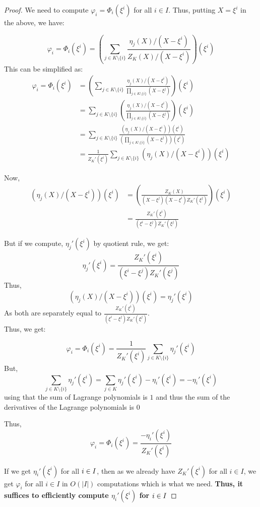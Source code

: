 \begin{proof}
    We need to compute $\varphi_i=\Phi_i(\xi^i)$ for all $i \in I$. Thus, putting $X=\xi^i$ in the above, we have:

    $$\varphi_i = \Phi_i(\xi^i) = \left(\sum_{j\in K\setminus \{i\}}\frac{\eta_j(X)/(X-\xi^i)}{Z_K(X)/(X-\xi^i)}\right)(\xi^i)$$
    This can be simplified as:
    \begin{align*}\varphi_i = \Phi_i(\xi^i) &= \left(\sum_{j\in K\setminus \{i\}}\frac{\eta_j(X)/(X-\xi^i)}{\prod_{j \in K \setminus \{i\}}(X-\xi^j)}\right)(\xi^i)\\
    &= \sum_{j\in K\setminus \{i\}}\left(\frac{\eta_j(X)/(X-\xi^i)}{\prod_{j \in K \setminus \{i\}}(X-\xi^j)}\right)(\xi^i)\\
    &= \sum_{j\in K\setminus \{i\}}\frac{\left(\eta_j(X)/(X-\xi^i)\right)(\xi^i)}{\left(\prod_{j \in K \setminus \{i\}}(X-\xi^j)\right)(\xi^i)}\\
    &= \frac{1}{Z_K'(\xi^i)}\sum_{j\in K\setminus \{i\}}\left(\eta_j(X)/(X-\xi^i)\right)(\xi^i)
    \end{align*}

    Now, \begin{align*}
             \left(\eta_j(X)/(X-\xi^i)\right)(\xi^i)&=\left(\frac{Z_K(X)}{(X-\xi^j)(X-\xi^i)Z_K'(\xi^j)}\right)(\xi^i)\\
             &= \frac{Z_K'(\xi^i)}{(\xi^i-\xi^j)Z_K'(\xi^j)}
    \end{align*}

    But if we compute, $\eta_j'(\xi^i)$ by quotient rule, we get:
    $$\eta_j'(\xi^i)=\frac{Z_K'(\xi^i)}{(\xi^i-\xi^j)Z_K'(\xi^j)}$$
    Thus,
    $$\left(\eta_j(X)/(X-\xi^i)\right)(\xi^i)=\eta_j'(\xi^i) $$
    As both are separately equal to $\frac{Z_K'(\xi^i)}{(\xi^i-\xi^j)Z_K'(\xi^j)}$.\\
    Thus, we get:


    $$\varphi_i =\Phi_i(\xi^i) =  \frac{1}{Z_K'(\xi^i)}\sum_{j\in K\setminus \{i\}}\eta_j'(\xi^i)$$
    But, $$\sum_{j\in K\setminus \{i\}}\eta_j'(\xi^i)= \sum_{j\in K}\eta_j'(\xi^i)-\eta_i'(\xi^i)=-\eta_i'(\xi^i)$$
    using that the sum of Lagrange polynomials is $1$ and thus the sum of the derivatives of the Lagrange polynomials is $0$

    Thus,
    $$\varphi_i =\Phi_i(\xi^i) = \frac{-\eta_i'(\xi^i)}{Z_K'(\xi^i)}$$

    If we get $\eta_i'(\xi^i)$ for all $i\in I$, then as we already have $Z_K'(\xi^i)$ for all $i \in I$, we get $\varphi_i$ for all $i \in I$ in $O(|I|)$ computations which is what we need. \textbf{Thus, it suffices to efficiently compute $\eta_i'(\xi^i)$ for $i\in I$}


\end{proof}
